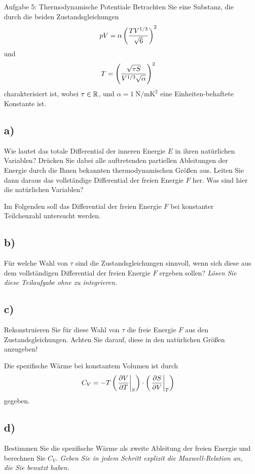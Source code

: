 \begin{aufgabe}{Aufgabe 5: Thermodynamische Potentiale}
    Betrachten Sie eine Substanz, die durch die beiden Zustandsgleichungen
    \[
        pV = \alpha \left(\frac{TV^{1/3}}{\sqrt{6}}\right)^2
    \]
    und
    \[
        T = \left(\frac{\sqrt{\tau S}} {V^{1/3}\sqrt{\alpha}}\right)^2
    \]
    charakterisiert ist,
    wobei $\tau \in \mathbb{R}$, und $\alpha = \SI{1}{\newton\per\meter\square\kelvin}$ eine Einheiten-behaftete Konstante ist.

    \subsection{a)}
    Wie lautet das totale Differential der inneren Energie $E$ in ihren natürlichen Variablen?
    Drücken Sie dabei alle auftretenden partiellen Ableitungen der Energie durch die Ihnen bekannten thermodynamischen Größen aus.
    Leiten Sie dann daraus das vollständige Differential der freien Energie $F$ her.
    Was sind hier die natürlichen Variablen?


    Im Folgenden soll das Differential der freien Energie $F$ bei konstanter Teilchenzahl untersucht werden.

    \subsection{b)}
    Für welche Wahl von $\tau$ sind die Zustandsgleichungen sinnvoll,
    wenn sich diese aus dem vollständigen Differential der freien Energie $F$ ergeben sollen?
    \textit{Lösen Sie diese Teilaufgabe ohne zu integrieren.}

    \subsection{c)}
    Rekonstruieren Sie für diese Wahl von $\tau$ die freie Energie $F$ aus den Zustandsgleichungen.
    Achten Sie darauf, diese in den natürlichen Größen anzugeben!


    Die spezifische Wärme bei konstantem Volumen ist durch
    \[
        C_V = -T \left(\left.\frac{\partial V}{\partial T}\right\rvert_{S}\right) \cdot \left(\left.\frac{\partial S}{\partial V}\right\rvert_{T}\right)
    \]
    gegeben.

    \subsection{d)}
    Bestimmen Sie die spezifische Wärme als zweite Ableitung der freien Energie und berechnen Sie $C_V$.
    \textit{Geben Sie in jedem Schritt explizit die Maxwell-Relation an, die Sie benutzt haben.}
\end{aufgabe}

